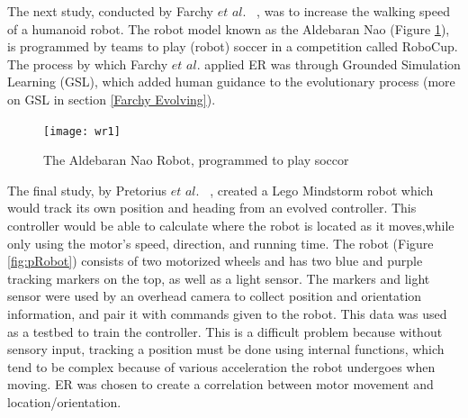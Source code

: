 \documentclass{sig-alternate}
\begin{document}
	
	The next study, conducted by Farchy $et$ $al.$ ~\cite{Farchy:2013:HRL:2484920.2484930}, was to increase the walking speed of a humanoid robot. The robot model known as the Aldebaran Nao (Figure \ref{fig:wRobot}), is programmed by teams to play (robot) soccer in a competition called RoboCup. The process by which  Farchy $et$ $al.$ applied ER was through Grounded Simulation Learning (GSL), which added human guidance to the evolutionary process (more on GSL in section \ref{Farchy Evolving}). 
	
\begin{figure}%
\begin{center}
  \texttt{[image: wr1]}
\end{center}
\caption{The Aldebaran Nao Robot, programmed to play soccor}
\label{fig:wRobot}
\end{figure}

	The final study, by Pretorius $et$ $al.$ ~\cite{Pretorius:2009:TAN:1632149.1632171}, created a Lego Mindstorm robot which would track its own position and heading from an evolved controller. This controller would be able to calculate where the robot is located as it moves,while only using the motor's speed, direction, and running time. The robot (Figure \ref{fig:pRobot}) consists of two motorized wheels and has two blue and purple tracking markers on the top, as well as a light sensor. The markers and light sensor were used by an overhead camera to collect position and orientation information, and pair it with commands given to the robot. This data was used as a testbed to train the controller. This is a difficult problem because without sensory input, tracking a position must be done using internal functions, which tend to be complex because of various acceleration the robot undergoes when moving. ER was chosen to create a correlation between motor movement and location/orientation. 
\end{document}
